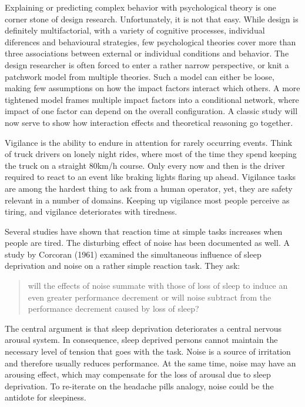 \documentclass[]{svmono}
\theoremstyle{definition}
\theoremstyle{definition}
\theoremstyle{definition}
\theoremstyle{remark}
\begin{document}
Explaining or predicting complex behavior with psychological theory is
one corner stone of design research. Unfortunately, it is not that easy.
While design is definitely multifactorial, with a variety of cognitive
processes, individual diferences and behavioural strategies, few
psychological theories cover more than three associations between
external or individual conditions and behavior. The design researcher is
often forced to enter a rather narrow perspective, or knit a patchwork
model from multiple theories. Such a model can either be loose, making
few assumptions on how the impact factors interact which others. A more
tightened model frames multiple impact factors into a conditional
network, where impact of one factor can depend on the overall
configuration. A classic study will now serve to show how interaction
effects and theoretical reasoning go together.

Vigilance is the ability to endure in attention for rarely occurring
events. Think of truck drivers on lonely night rides, where most of the
time they spend keeping the truck on a straight 80km/h course. Only
every now and then is the driver required to react to an event like
braking lights flaring up ahead. Vigilance tasks are among the hardest
thing to ask from a human operator, yet, they are safety relevant in a
number of domains. Keeping up vigilance most people perceive as tiring,
and vigilance deteriorates with tiredness.

Several studies have shown that reaction time at simple tasks increases
when people are tired. The disturbing effect of noise has been
documented as well. A study by Corcoran (1961) examined the simultaneous
influence of sleep deprivation and noise on a rather simple reaction
task. They ask:

\begin{quote}
will the effects of noise summate with those of loss of sleep to induce
an even greater performance decrement or will noise subtract from the
performance decrement caused by loss of sleep?
\end{quote}

The central argument is that sleep deprivation deteriorates a central
nervous arousal system. In consequence, sleep deprived persons cannot
maintain the necessary level of tension that goes with the task. Noise
is a source of irritation and therefore usually reduces performance. At
the same time, noise may have an arousing effect, which may compensate
for the loss of arousal due to sleep deprivation. To re-iterate on the
headache pills analogy, noise could be the antidote for sleepiness.
\end{document}
